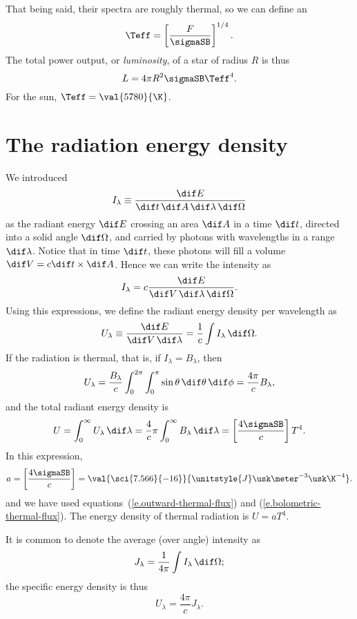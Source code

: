  That being said, their spectra are roughly thermal, so we can define an 
\[	\Teff = \left[\frac{F}{\sigmaSB}\right]^{1/4}. \]
The total power output, or \emph{luminosity}, of a star of radius $R$ is thus
\[
	L = 4\pi R^{2}\sigmaSB \Teff^{4}.
\]
For the sun, $\Teff = \val{5780}{\K}$.


\section{The radiation energy density}\label{s.radiation-energy-density}

We introduced
\[
I_{\lambda} \equiv \frac{\dif E}{\dif t\,\dif A\,\dif\lambda\,\dif\Omega}
\]
as the radiant energy $\dif E$ crossing an area $\dif A$ in a time $\dif t$, directed into a solid angle $\dif\Omega$, and carried by photons with wavelengths in a range $\dif\lambda$. Notice that in time $\dif t$, these photons will fill a volume $\dif V = c\dif t\times \dif A$. Hence we can write the intensity as
\[
I_{\lambda} = c\frac{\dif E}{\dif V\,\dif \lambda\,\dif\Omega}.
\]
Using this expressions, we define the radiant energy density per wavelength as
\begin{equation}
	U_{\lambda} \equiv \frac{\dif E}{\dif V\,\dif\lambda} = \frac{1}{c}\int I_{\lambda}\,\dif \Omega.
\end{equation}
If the radiation is thermal, that is, if $I_{\lambda} = B_{\lambda}$, then
\[
U_{\lambda} = \frac{B_{\lambda}}{c}\int_{0}^{2\pi}\int_{0}^{\pi}\sin\theta\,\dif\theta\,\dif\phi = \frac{4\pi}{c}B_{\lambda},
\]
and the total radiant energy density is
\[
U = \int_{0}^{\infty}U_{\lambda}\,\dif\lambda = \frac{4}{c}\pi\int_{0}^{\infty}B_{\lambda}\,\dif\lambda = \left[\frac{4\sigmaSB}{c}\right] T^{4}.
\]
In this expression, 
\[ 
a = \left[\frac{4\sigmaSB}{c}\right] = \val{\sci{7.566}{-16}}{\unitstyle{J}\usk\meter^{-3}\usk\K^{-4}}.
\]
and we have used equations~(\ref{e.outward-thermal-flux}) and (\ref{e.bolometric-thermal-flux}). The energy density of thermal radiation is $U = aT^{4}$.

It is common to denote the average (over angle) intensity as
\begin{equation}\label{e.angle-average-intensity}
J_{\lambda} = \frac{1}{4\pi}\int I_{\lambda}\,\dif\Omega;
\end{equation}
the specific energy density is thus
\[ U_{\lambda} = \frac{4\pi}{c}J_{\lambda}. \]

